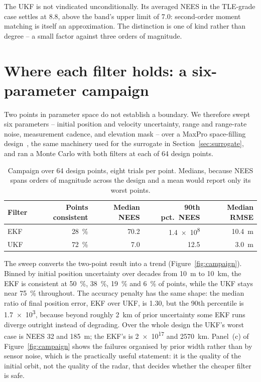 \documentclass[11pt]{article}
\begin{document}
The UKF is not vindicated unconditionally. Its averaged NEES in the
TLE-grade case settles at \num{8.8}, above the band's upper limit of
\num{7.0}: second-order moment matching is itself an approximation. The
distinction is one of kind rather than degree -- a small factor against
three orders of magnitude.

\section{Where each filter holds: a six-parameter campaign}\label{sec:campaign}

Two points in parameter space do not establish a boundary. We therefore
swept six parameters -- initial position and velocity uncertainty, range and
range-rate noise, measurement cadence, and elevation mask -- over a MaxPro
space-filling design~\cite{rusis}, the same machinery used for the surrogate
in Section~\ref{sec:surrogate}, and ran a Monte Carlo with both filters at
each of 64 design points.

\begin{table}[htbp]
\centering
\caption{Campaign over 64 design points, eight trials per point. Medians,
         because NEES spans orders of magnitude across the design and a mean
         would report only its worst points.}
\label{tab:campaign}
\begin{tabular}{lrrrr}
\toprule
Filter & {Points consistent} & {Median NEES} & {90th pct.\ NEES} & {Median RMSE} \\
\midrule
EKF & \SI{28}{\percent} & \num{70.2} & \num{1.4e8} & \SI{10.4}{\meter} \\
UKF & \SI{72}{\percent} & \num{7.0}  & \num{12.5}  & \SI{3.0}{\meter} \\
\bottomrule
\end{tabular}
\end{table}

The sweep converts the two-point result into a trend
(Figure~\ref{fig:campaign}). Binned by initial position uncertainty over
decades from \SI{10}{\meter} to \SI{10}{\kilo\meter}, the EKF is consistent
at \SI{50}{\percent}, \SI{38}{\percent}, \SI{19}{\percent} and
\SI{6}{\percent} of points, while the UKF stays near \SI{75}{\percent}
throughout. The accuracy penalty has the same shape: the median ratio of
final position error, EKF over UKF, is \num{1.30}, but the 90th percentile
is \num{1.7e3}, because beyond roughly \SI{2}{\kilo\meter} of prior
uncertainty some EKF runs diverge outright instead of degrading. Over the
whole design the UKF's worst case is NEES \num{32} and \SI{185}{\meter};
the EKF's is \num{2e17} and \SI{2570}{\kilo\meter}. Panel~(c) of
Figure~\ref{fig:campaign} shows the failures organised by prior width rather
than by sensor noise, which is the practically useful statement: it is the
quality of the initial orbit, not the quality of the radar, that decides
whether the cheaper filter is safe.
\end{document}
